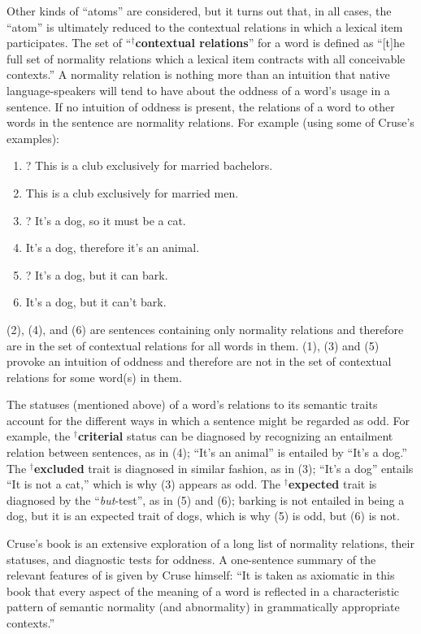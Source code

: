 \documentclass[12pt]{amsart}
\begin{document}
Other kinds of ``atoms'' are considered, but it turns out that, in all cases, the ``atom'' is ultimately reduced to the contextual relations in which a lexical item participates. The set of ``$^\dagger${\bf contextual relations}'' for a word is defined as ``[t]he full set of normality relations which a lexical item contracts with all conceivable contexts.'' A normality relation is nothing more than an intuition that native language-speakers will tend to have about the oddness of a word's usage in a sentence. If no intuition of oddness is present, the relations of a word to other words in the sentence are normality relations. For example (using some of Cruse's examples):
\begin{enumerate}
\item ? This is a club exclusively for married bachelors.
\item This is a club exclusively for married men.
\item ? It's a dog, so it must be a cat.
\item It's a dog, therefore it's an animal.
\item ? It's a dog, but it can bark.
\item It's a dog, but it can't bark.
\end{enumerate}
(2), (4), and (6) are sentences containing only normality relations and therefore are in the set of contextual relations for all words in them. (1), (3) and (5) provoke an intuition of oddness and therefore are not in the set of contextual relations for some word(s) in them.

The statuses (mentioned above) of a word's relations to its semantic traits account for the different ways in which a sentence might be regarded as odd. For example, the $^\dagger${\bf criterial} status can be diagnosed by recognizing an entailment relation between sentences, as in (4); ``It's an animal'' is entailed by ``It's a dog.'' The $^\dagger${\bf excluded} trait is diagnosed in similar fashion, as in (3); ``It's a dog'' entails ``It is not a cat,'' which is why (3) appears as odd. The $^\dagger${\bf expected} trait is diagnosed by the ``\emph{but}-test'', as in (5) and (6); barking is not entailed in being a dog, but it is an expected trait of dogs, which is why (5) is odd, but (6) is not.

Cruse's book is an extensive exploration of a long list of normality relations, their statuses, and diagnostic tests for oddness. A one-sentence summary of the relevant features of \cite{cruse_lexical_1986} is given by Cruse himself: ``It is taken as axiomatic in this book that every aspect of the meaning of a word is reflected in a characteristic pattern of semantic normality (and abnormality) in grammatically appropriate contexts.''
\end{document}

